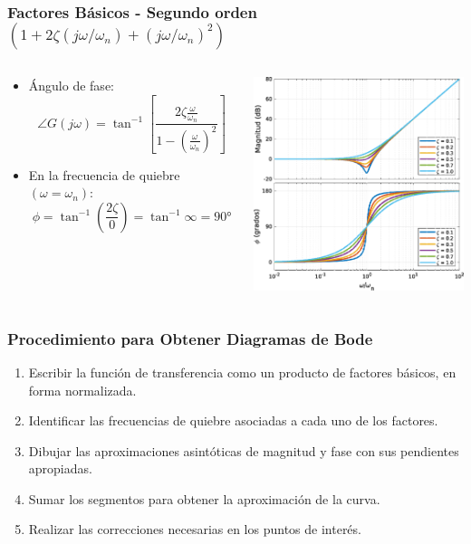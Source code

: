 \documentclass[aspectratio=169]{beamer}
\theoremstyle{definition}
\theoremstyle{plain}
\theoremstyle{remark}
\begin{document}
\begin{frame}[<+->]\frametitle{Factores Básicos - Segundo orden $(1+2\zeta(j\omega/\omega_n)+(j\omega/\omega_n)^2)$}
\vspace*{7mm}
\begin{columns}
	\begin{column}{0.5\textwidth}
	\begin{itemize}
		\item Ángulo de fase:
		\begin{equation*}
			\angle G(j\omega) = \tan^{-1} \left[\frac{2\zeta\frac{\omega}{\omega_n}}{1-\left(\frac{\omega}{\omega_n}\right)^2} \right]
		\end{equation*}
		\item En la frecuencia de quiebre $(\omega = \omega_n)$:
		\begin{equation*}
			\phi = \tan^{-1}\left(\frac{2\zeta}{0}\right) = \tan^{-1}\infty = \ang{90}
		\end{equation*}
	\end{itemize}
	\end{column}
	\begin{column}{0.5\textwidth}
	\centering
	\includegraphics[width=6.5cm]{images/bodeSecondOrderDerivative.eps}
	\end{column}
\end{columns}
\end{frame}

\begin{frame}[<+->]\frametitle{Procedimiento para Obtener Diagramas de Bode}
	\begin{enumerate}
		\item Escribir la función de transferencia como un producto de factores básicos, en forma normalizada.
		\item Identificar las frecuencias de quiebre asociadas a cada uno de los factores.
		\item Dibujar las aproximaciones asintóticas de magnitud y fase con sus pendientes apropiadas.
		\item Sumar los segmentos para obtener la aproximación de la curva.
		\item Realizar las correcciones necesarias en los puntos de interés.
	\end{enumerate}
\end{frame}
\end{document}
